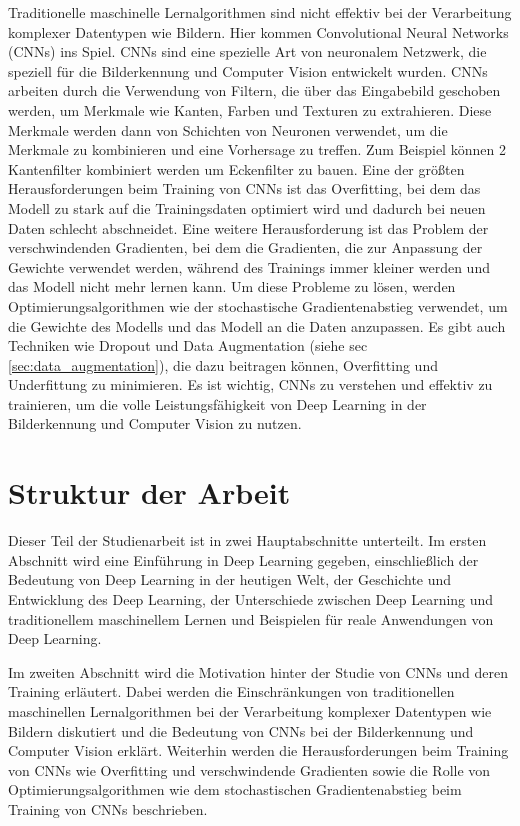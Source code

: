    Traditionelle maschinelle Lernalgorithmen sind nicht effektiv bei der Verarbeitung komplexer Datentypen wie Bildern. Hier kommen Convolutional Neural Networks (CNNs) ins Spiel. 
    CNNs sind eine spezielle Art von neuronalem Netzwerk, die speziell für die Bilderkennung und Computer Vision entwickelt wurden. 
    CNNs arbeiten durch die Verwendung von Filtern, die über das Eingabebild geschoben werden, um Merkmale wie Kanten, Farben und Texturen zu extrahieren. 
    Diese Merkmale werden dann von Schichten von Neuronen verwendet, um die Merkmale zu kombinieren und eine Vorhersage zu treffen. Zum Beispiel können 2 Kantenfilter kombiniert werden um Eckenfilter zu bauen. 
    Eine der größten Herausforderungen beim Training von CNNs ist das Overfitting, bei dem das Modell zu stark auf die Trainingsdaten optimiert wird und dadurch bei neuen Daten schlecht abschneidet. 
    Eine weitere Herausforderung ist das Problem der verschwindenden Gradienten, bei dem die Gradienten, die zur Anpassung der Gewichte verwendet werden, während des Trainings immer kleiner werden und das Modell nicht mehr lernen kann. 
    Um diese Probleme zu lösen, werden Optimierungsalgorithmen wie der stochastische Gradientenabstieg verwendet, um die Gewichte des Modells und das Modell an die Daten anzupassen. 
    Es gibt auch Techniken wie Dropout und Data Augmentation (siehe sec \ref{sec:data_augmentation}), die dazu beitragen können, Overfitting und Underfittung zu minimieren. 
    Es ist wichtig, CNNs zu verstehen und effektiv zu trainieren, um die volle Leistungsfähigkeit von Deep Learning in der Bilderkennung und Computer Vision zu nutzen. 
    
\section{Struktur der Arbeit}

    Dieser Teil der Studienarbeit ist in zwei Hauptabschnitte unterteilt.
    Im ersten Abschnitt wird eine Einführung in Deep Learning gegeben, einschließlich der Bedeutung von Deep Learning in der heutigen Welt, der Geschichte und Entwicklung des Deep Learning, der Unterschiede zwischen Deep Learning und traditionellem maschinellem Lernen und Beispielen für reale Anwendungen von Deep Learning.
    
    Im zweiten Abschnitt wird die Motivation hinter der Studie von CNNs und deren Training erläutert. Dabei werden die Einschränkungen von traditionellen maschinellen Lernalgorithmen bei der Verarbeitung komplexer Datentypen wie Bildern diskutiert und die Bedeutung von CNNs bei der Bilderkennung und Computer Vision erklärt. Weiterhin werden die Herausforderungen beim Training von CNNs wie Overfitting und verschwindende Gradienten sowie die Rolle von Optimierungsalgorithmen wie dem stochastischen Gradientenabstieg beim Training von CNNs beschrieben.

